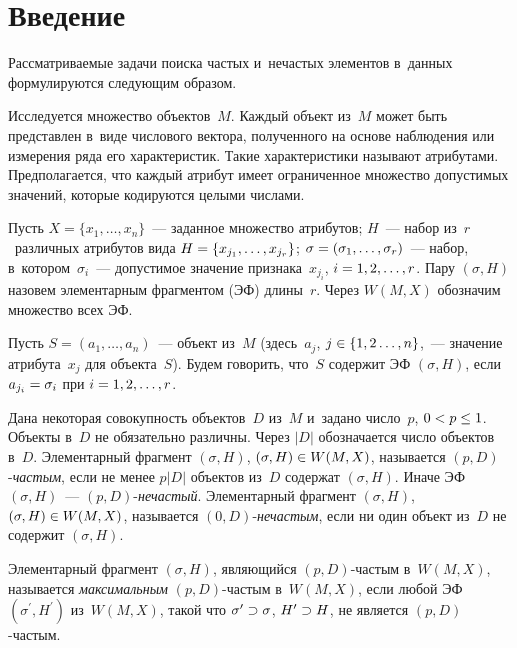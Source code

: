 
\thispagestyle{headings}

\begin{multicols}{2}

\label{st\stat}
  
\section{Введение}

  Рассматриваемые задачи поиска частых и~не\-час\-тых элементов в~данных 
формулируются сле\-ду\-ющим образом.
  
  Исследуется множество объектов~$M$. Каждый объект из~$M$ может быть 
представлен в~виде числового вектора, полученного на основе наблюдения или 
измерения ряда его характеристик. Такие характеристики называют 
атрибутами. Предполагается, что каждый атрибут имеет ограниченное 
множество допустимых значений, которые кодируются целыми числами.
  
  Пусть $X=\{x_1, \ldots , x_n\}$~--- заданное множество атрибутов;   $H$~---
  набор 
из~$r$~различных атрибутов вида $H\hm= \{ x_{j_1}, \ldots , x_{j_r}\}$; 
$\sigma\hm= \left( \sigma_1, \ldots , \sigma_r\right)$~--- набор, 
в~котором~$\sigma_i$~--- допустимое значение признака~$x_{j_i}$, $i\hm= 1,2, 
\ldots, r$. Пару $(\sigma, H)$ назовем элементарным фрагментом (ЭФ) 
длины~$r$. Через $W(M,X)$ обозначим множество всех ЭФ.
  
  Пусть $S=(a_1,\ldots , a_n)$~--- объект из~$M$ (здесь~$a_j$, $j\hm\in \{1, 2 
\ldots ,n\}$,~--- значение атрибута~$x_j$ для объекта~$S$). Будем говорить, 
что~$S$ содержит ЭФ $(\sigma, H)$, если $a_{j_i}\hm= \sigma_i$ при $i\hm= 
1,2,\ldots , r$.
  
  Дана некоторая совокупность объектов~$D$ из~$M$ и~задано число~$p$, 
$0\hm< p\hm\leq 1$. Объекты в~$D$ не обязательно различны. Через $\vert 
D\vert$ обозначается чис\-ло объектов в~$D$. Элементарный фрагмент $(\sigma, 
H)$, $(\sigma,H)\hm\in W(M,X)$, называется $(p,D)$-\textit{час\-тым}, если не 
менее $p\vert D\vert$ объектов %
из~$D$ содержат $(\sigma, H)$. 
Иначе ЭФ $(\sigma, H)$~--- $(p,D)$-\textit{не\-час\-тый}. Элементарный 
фрагмент $(\sigma, H)$, $(\sigma, H)\hm\in W(M,X)$, называется  
\mbox{$(0,D)$-\textit{не}}\-\textit{час\-тым}, если ни один объект из~$D$ не содержит 
$(\sigma, H)$.
  
  Элементарный фрагмент $(\sigma, H)$, являющийся $(p,D)$-час\-тым 
в~$W(M,X)$, называется \textit{максимальным} $(p,D)$-час\-тым в~$W(M,X)$, 
если любой ЭФ $(\sigma^\prime, H^\prime)$ из~$W(M,X)$, такой что 
$\sigma^\prime \hm\supset \sigma$, $H^\prime \hm\supset H$, не является  
$(p,D)$-час\-тым.
  

\end{multicols}
